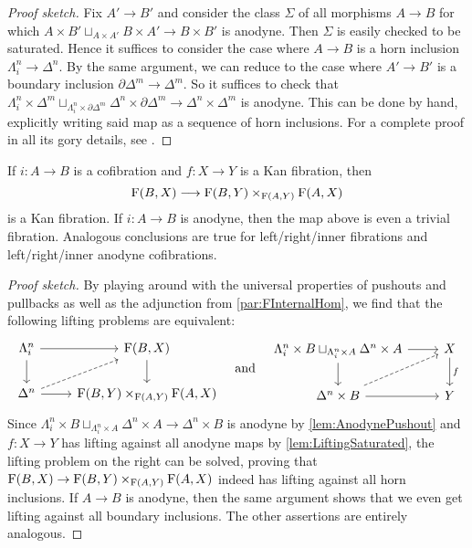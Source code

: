 \begin{proof}[Proof sketch]
	Fix $A'\rightarrow B'$ and consider the class $\Sigma$ of all morphisms $A\rightarrow B$ for which $A\times B'\sqcup_{A\times A'}B\times A'\rightarrow B\times B'$ is anodyne. Then $\Sigma$ is easily checked to be saturated. Hence it suffices to consider the case where $A\rightarrow B$ is a horn inclusion $\Lambda_i^n\rightarrow \Delta^n$. By the same argument, we can reduce to the case where $A'\rightarrow B'$ is a boundary inclusion $\partial \Delta^m\rightarrow \Delta^m$. So it suffices to check that $\Lambda_i^n\times \Delta^m\sqcup_{\Lambda_i^n\times \partial\Delta^m}\Delta^n\times \partial\Delta^m\rightarrow \Delta^n\times \Delta^m$ is anodyne. This can be done by hand, explicitly writing said map as a sequence of horn inclusions. For a complete proof in all its gory details, see \cite[Lemma~1.3.31]{Land}.
\end{proof}
\begin{cor}\label{cor:FKanFibration}
	If $i\colon A\rightarrow B$ is a cofibration and $f\colon X\rightarrow Y$ is a Kan fibration, then
	\begin{equation*}
		\operatorname{F}(B,X)\longrightarrow\operatorname{F}(B,Y)\times_{\operatorname{F}(A,Y)}\operatorname{F}(A,X)
	\end{equation*}
	is a Kan fibration. If $i\colon A\rightarrow B$ is anodyne, then the map above is even a trivial fibration. Analogous conclusions are true for left/right/inner fibrations and left/right/inner anodyne cofibrations.
\end{cor}
\begin{proof}[Proof sketch]
	By playing around with the universal properties of pushouts and pullbacks as well as the adjunction from \cref{par:FInternalHom}, we find that the following lifting problems are equivalent:
	\begin{equation*}
		\begin{tikzcd}
			\Lambda_i^n\rar\dar & \F(B,X)\dar\\
			\Delta^n\rar\urar[dashed] & \F(B,Y)\times_{\F(A,Y)}\F(A,X)
		\end{tikzcd}\quad\text{and}\quad
		\begin{tikzcd}
			\Lambda_i^n\times B\sqcup_{\Lambda_i^n\times A}\Delta^n\times A\rar\dar & X\dar["f"]\\
			\Delta^n\times B\urar[dashed]\rar & Y
		\end{tikzcd}
	\end{equation*}
	Since $\Lambda_i^n\times B\sqcup_{\Lambda_i^n\times A}\Delta^n\times  A\rightarrow \Delta^n\times B$ is anodyne by \cref{lem:AnodynePushout} and $f\colon X\rightarrow Y$ has lifting against all anodyne maps by \cref{lem:LiftingSaturated}, the lifting problem on the right can be solved, proving that $\operatorname{F}(B,X)\rightarrow \operatorname{F}(B,Y)\times_{\operatorname{F}(A,Y)}\operatorname{F}(A,X)$ indeed has lifting against all horn inclusions. If $A\rightarrow B$ is anodyne, then the same argument shows that we even get lifting against all boundary inclusions. The other assertions are entirely analogous.
\end{proof}
